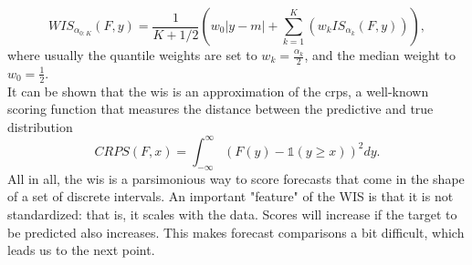 \begin{equation}
WIS_{\alpha_{0:K}}(F,y) = \frac{1}{K + 1/2}\left(w_{0}|y-m| + \sum_{k=1}^{K}\left(w_k IS_{\alpha_{k}}(F, y)\right)\right),
\end{equation}
where usually the quantile weights are set to $w_k = \frac{\alpha_{k}}{2}$, and the median weight to $w_{0} = \frac{1}{2}$.\\
It can be shown that the \ac{wis} is an approximation of the \ac{crps}, a well-known scoring function that measures the distance between the predictive and true distribution 
\begin{equation}
CRPS(F, x) = \int_{-\infty}^{\infty} \left(F(y) - \mathbb{1}(y \geq x) \right)^2dy.
\end{equation}
All in all, the \ac{wis} is a parsimonious way to score forecasts that come in the shape of a set of discrete intervals.
An important "feature" of the WIS is that it is not standardized: that is, it scales with the data. Scores will increase if the target to be predicted also increases. This makes forecast comparisons a bit difficult, which leads us to the next point.
